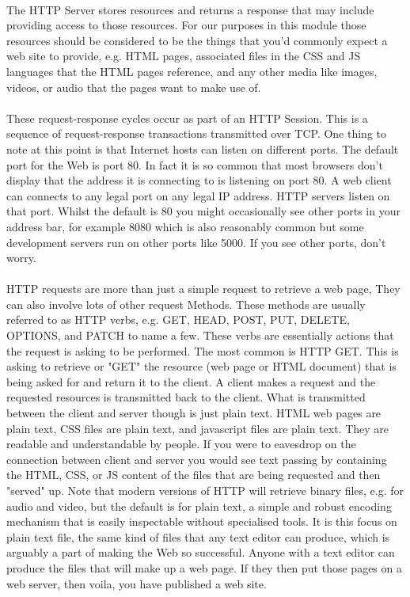 \paragraph{} The HTTP Server stores resources and returns a response that may include providing access to those resources. For our purposes in this module those resources should be considered to be the things that you'd commonly expect a web site to provide, e.g. HTML pages, associated files in the CSS and JS languages that the HTML pages reference, and any other media like images, videos, or audio that the pages want to make use of.
\paragraph{} These request-response cycles occur as part of an HTTP Session. This is a sequence of request-response transactions transmitted over TCP.  One thing to note at this point is that Internet hosts can listen on different ports. The default port for the Web is port 80. In fact it is so common that most browsers don't display that the address it is connecting to is listening on port 80. A web client can connects to any legal port on any legal IP address. HTTP servers listen on that port. Whilst the default is 80 you might occasionally see other ports in your address bar, for example 8080 which is also reasonably common but some development servers run on other ports like 5000. If you see other ports, don't worry. 
\paragraph{} HTTP requests are more than just a simple request to retrieve a web page, They can also involve lots of other request Methods. These methods are usually referred to as  HTTP verbs, e.g. GET, HEAD, POST, PUT, DELETE, OPTIONS, and PATCH to name a few. These verbs are essentially actions that the request is asking to be performed. The most common is HTTP GET. This is asking to retrieve or "GET" the resource (web page or HTML document) that is being asked for and return it to the client. A client makes a request and the requested resources is transmitted back to the client. What is transmitted between the client and server though is just plain text. HTML web pages are plain text, CSS files are plain text, and javascript files are plain text. They are readable and understandable by people. If you were to eavesdrop on the connection between client and server you would see text passing by containing the HTML, CSS, or JS content of the files that are being requested and then "served" up. Note that modern versions of HTTP will retrieve binary files, e.g. for audio and video, but the default is for plain text, a simple and robust encoding mechanism that is easily inspectable without specialised tools. It is this focus on plain text file, the same kind of files that any text editor can produce, which is arguably a part of making the Web so successful. Anyone with a text editor can produce the files that will make up a web page. If they then put those pages on a web server, then voila, you have published a web site.
